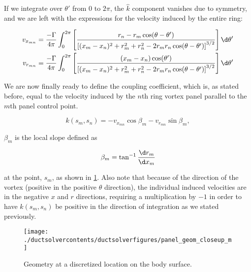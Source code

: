 \noindent If we integrate over \(\theta'\) from 0 to \(2\pi\), the \(\hat{k}\) component vanishes due to symmetry, and we are left with the expressions for the velocity induced by the entire ring:

\begin{equation}
	\begin{aligned}
		v_{x_{mn}} &= \frac{-\Gamma}{4\pi} \int_0^{2\pi} \left[ \frac{r_n - r_m\cos(\theta - \theta')}{\left[(x_m-x_n)^2 + r_m^2 + r_n^2 - 2 r_m r_n \cos(\theta-\theta')\right]^{3/2}} \right]\d\theta' \\
		v_{r_{mn}} &= \frac{-\Gamma}{4\pi} \int_0^{2\pi} \left[ \frac{(x_m-x_n)\cos(\theta')}{\left[(x_m-x_n)^2 + r_m^2 + r_n^2 - 2 r_m r_n \cos(\theta-\theta')\right]^{3/2}} \right]\d\theta'
	\end{aligned}
\end{equation}


We are now finally ready to define the coupling coefficient, which is, as stated before, equal to the velocity induced by the \(n\)th ring vortex panel parallel to the \(m\)th panel control point.

\begin{equation}
	k(s_m, s_n)  = -v_{x_{mn}} \cos\beta_m - v_{r_{mn}} \sin\beta_m,
\end{equation}

\where \(\beta_m\) is the local slope defined as

\begin{equation}
	\beta_m = \tan^{-1} \frac{\d r_m}{\d x_m}
\end{equation}

\noindent at the point, \(s_m\), as shown in \cref{fig:panel_geom_closeup_m}.
Also note that because of the direction of the vortex (positive in the positive \(\theta\) direction), the individual induced velocities are in the negative \(x\) and \(r\) directions, requiring a multiplication by \(-1\) in order to have \(k(s_m,s_n)\) be positive in the direction of integration as we stated previously.


\begin{figure}[h!]
	\centering
	\texttt{[image: ./ductsolvercontents/ductsolverfigures/panel\_geom\_closeup\_m]}
	\caption{Geometry at a discretized location on the body surface.}
	\label{fig:panel_geom_closeup_m}
\end{figure}


